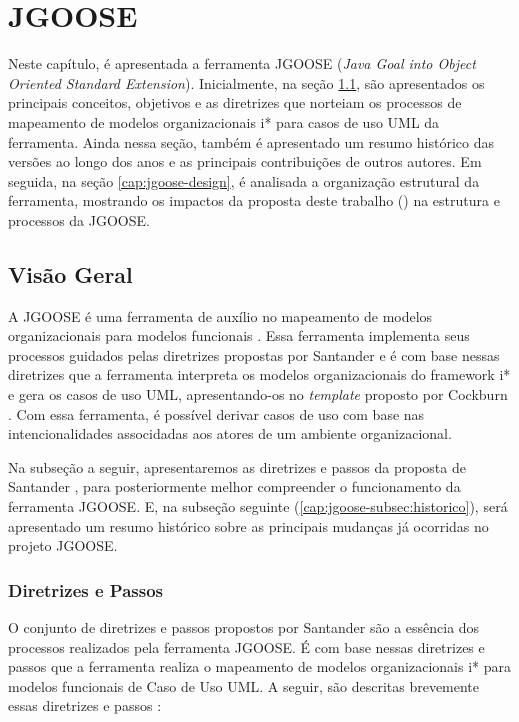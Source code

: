     \chapter{JGOOSE}
        \label{cap:jgoose}
            Neste capítulo,
            é apresentada a ferramenta JGOOSE (\emph{Java Goal into Object Oriented Standard Extension}).
            Inicialmente, na seção \ref{cap:jgoose-sec:overview},
                são apresentados os principais conceitos, objetivos e as diretrizes que norteiam os processos de mapeamento de modelos organizacionais i* para casos de uso UML da ferramenta.
                Ainda nessa seção, também é apresentado um resumo histórico das versões ao longo dos anos e as principais contribuições de outros autores.
            Em seguida, na seção \ref{cap:jgoose-design},
                é analisada a organização estrutural da ferramenta, mostrando os impactos da proposta deste trabalho (\ferramenta{}) na estrutura e processos da JGOOSE.

    \section{Visão Geral}
        \label{cap:jgoose-sec:overview}
            A JGOOSE é uma ferramenta de auxílio no mapeamento de modelos organizacionais para modelos funcionais \cite{vicente2006}.
            Essa ferramenta implementa seus processos guidados pelas diretrizes propostas por Santander \cite{santander2002integrando} e é com base nessas diretrizes que a ferramenta interpreta os modelos organizacionais do framework i* e gera os casos de uso UML, apresentando-os no \emph{template} proposto por Cockburn \cite{cockburn2001writing}.
            Com essa ferramenta, é possível derivar casos de uso com base nas intencionalidades associdadas aos atores de um ambiente organizacional.

            Na subseção a seguir, apresentaremos as diretrizes e passos da proposta de Santander \cite{santander2002integrando}, para posteriormente melhor compreender o funcionamento da ferramenta JGOOSE.
            E, na subseção seguinte (\ref{cap:jgoose-subsec:historico}), será apresentado um resumo histórico sobre as principais mudanças já ocorridas no projeto JGOOSE.

        \subsection{Diretrizes e Passos}
            O conjunto de diretrizes e passos propostos por Santander \cite{santander2002integrando} são a essência dos processos realizados pela ferramenta JGOOSE.
            É com base nessas diretrizes e passos que a ferramenta realiza o mapeamento de modelos organizacionais i* para modelos funcionais de Caso de Uso UML.
            A seguir, são descritas brevemente essas diretrizes e passos \cite{brischke2012melhorando}:


